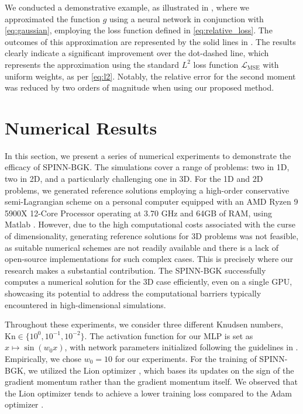 \documentclass[preprint,12pt]{elsarticle}
\begin{document}
We conducted a demonstrative example, as illustrated in , where we approximated the function $g$ using a neural network in conjunction with \eqref{eq:gaussian}, employing the loss function defined in \eqref{eq:relative_loss}.
The outcomes of this approximation are represented by the solid lines in .
The results clearly indicate a significant improvement over the dot-dashed line, which represents the approximation using the standard $L^2$ loss function \(\mathcal{L}_\mathrm{MSE}\) with uniform weights, as per \eqref{eq:l2}.
Notably, the relative error for the second moment was reduced by two orders of magnitude when using our proposed method. 


\section{Numerical Results}\label{sec:numerical_results}
In this section, we present a series of numerical experiments to demonstrate the efficacy of SPINN-BGK.
The simulations cover a range of problems: two in 1D, two in 2D, and a particularly challenging one in 3D.
For the 1D and 2D problems, we generated reference solutions employing a high-order conservative semi-Lagrangian scheme \cite{cho2021conservative2} on a personal computer equipped with an AMD Ryzen 9 5900X 12-Core Processor operating at 3.70 GHz and 64GB of RAM, using Matlab \cite{matlab}.
However, due to the high computational costs associated with the curse of dimensionality, generating reference solutions for 3D problems was not feasible, as suitable numerical schemes are not readily available and there is a lack of open-source implementations for such complex cases.
This is precisely where our research makes a substantial contribution.
The SPINN-BGK successfully computes a numerical solution for the 3D case efficiently, even on a single GPU, showcasing its potential to address the computational barriers typically encountered in high-dimensional simulations.

Throughout these experiments, we consider three different Knudsen numbers, $\mathrm{Kn} \in \{10^0, 10^{-1}, 10^{-2}\}$.
The activation function for our MLP is set as $x \mapsto \sin(w_0 x)$, with network parameters initialized following the guidelines in \cite{sitzmann2020implicit}.
Empirically, we chose $w_0 = 10$ for our experiments.
For the training of SPINN-BGK, we utilized the Lion optimizer \cite{chen2023symbolic}, which bases its updates on the sign of the gradient momentum rather than the gradient momentum itself.
We observed that the Lion optimizer tends to achieve a lower training loss compared to the Adam optimizer \cite{kingma2014adam}.
\end{document}
